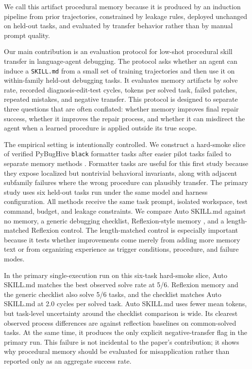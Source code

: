 We call this artifact procedural memory because it is produced by an induction pipeline from prior trajectories, constrained by leakage rules, deployed unchanged on held-out tasks, and evaluated by transfer behavior rather than by manual prompt quality.

Our main contribution is an evaluation protocol for low-shot procedural skill transfer in language-agent debugging. The protocol asks whether an agent can induce a \texttt{SKILL.md} from a small set of training trajectories and then use it on within-family held-out debugging tasks. It evaluates memory artifacts by solve rate, recorded diagnosis-edit-test cycles, tokens per solved task, failed patches, repeated mistakes, and negative transfer. This protocol is designed to separate three questions that are often conflated: whether memory improves final repair success, whether it improves the repair process, and whether it can misdirect the agent when a learned procedure is applied outside its true scope.

The empirical setting is intentionally controlled. We construct a hard-smoke slice of verified PyBugHive \texttt{black} formatter tasks after easier pilot tasks failed to separate memory methods \cite{antal2024pybughive}. Formatter tasks are useful for this first study because they expose localized but nontrivial behavioral invariants, along with adjacent subfamily failures where the wrong procedure can plausibly transfer. The primary study uses six held-out tasks run under the same model and harness configuration. All methods receive the same task prompt, isolated workspace, test command, budget, and leakage constraints. We compare Auto SKILL.md against no memory, a generic debugging checklist, Reflexion-style memory \cite{shinn2023reflexion}, and a length-matched Reflexion control. The length-matched control is especially important because it tests whether improvements come merely from adding more memory text or from organizing experience as trigger conditions, procedure, and failure modes.

In the primary single-execution run on this six-task hard-smoke slice, Auto SKILL.md matches the best observed solve rate at 5/6. Reflexion memory and the generic checklist also solve 5/6 tasks, and the checklist matches Auto SKILL.md at 2.0 cycles per solved task. Auto SKILL.md uses fewer mean tokens, but task-level uncertainty around the checklist comparison is wide. Its clearest observed process differences are against reflection baselines on common-solved tasks. At the same time, it produces the only explicit negative-transfer flag in the primary run. This failure is not incidental to the paper's contribution; it shows why procedural memory should be evaluated for misapplication rather than reported only as an aggregate success rate.

